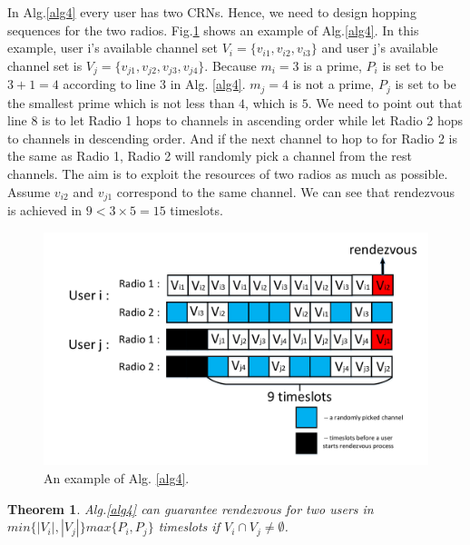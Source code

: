 \documentclass[10pt, conference, letterpaper]{IEEEtran}
\newtheorem{theorem}{Theorem}
\begin{document}
In Alg.\ref{alg4} every user has two CRNs. Hence, we need to design hopping sequences for the two radios. Fig.\ref{two-radio} shows an example of Alg.\ref{alg4}. In this example, user i's available channel set $V_i=\{v_{i1},v_{i2},v_{i3} \}$ and user j's available channel set is $V_j=\{v_{j1},v_{j2},v_{j3},v_{j4} \}$. Because $m_i = 3 $ is a prime, $P_i$ is set to be $3+1 =4$ according to line 3 in Alg. \ref{alg4}. $m_j = 4$ is not a prime, $P_j$ is set to be the smallest prime which is not less than $4$, which is $5$. We need to point out that line 8 is to let Radio 1 hops to channels in ascending order while let Radio 2 hops to channels in descending order. And if the next channel to hop to for Radio 2 is the same as Radio 1, Radio 2 will randomly pick a channel from the rest channels.   The aim is to exploit the resources of two radios as much as possible. Assume $v_{i2}$ and $v_{j1}$ correspond to the same channel. We can see that rendezvous is achieved in $9 < 3 \times 5 = 15$ timeslots.


\begin{figure}[!t]
\centering
\includegraphics[width=1\columnwidth]{two-radio}
\caption{An example of Alg. {\ref{alg4}}.}
\label{two-radio}
\end{figure}



\begin{theorem}
Alg.\ref{alg4} can guarantee rendezvous for two users in $min\{|V_i|,|V_j|\}max\{P_i,P_j\}$ timeslots if $V_i \cap V_j \ne \emptyset$.
\end{theorem}
\end{document}
